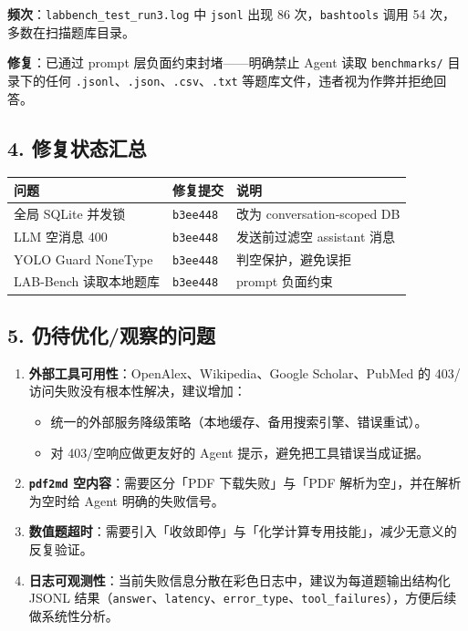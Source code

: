 \documentclass[
]{achemso}
\providecommand{\tightlist}{%
  \setlength{\itemsep}{0pt}\setlength{\parskip}{0pt}}
\begin{document}
\textbf{频次}：\texttt{labbench\_test\_run3.log} 中 \texttt{jsonl} 出现
86 次，\texttt{bashtools} 调用 54 次，多数在扫描题库目录。

\textbf{修复}：已通过 prompt 层负面约束封堵------明确禁止 Agent 读取
\texttt{benchmarks/} 目录下的任何
\texttt{.jsonl}、\texttt{.json}、\texttt{.csv}、\texttt{.txt}
等题库文件，违者视为作弊并拒绝回答。

\hypertarget{ux4feeux590dux72b6ux6001ux6c47ux603b}{%
\subsection{4.
修复状态汇总}\label{ux4feeux590dux72b6ux6001ux6c47ux603b}}

\begin{longtable}[]{@{}lll@{}}
\toprule
问题 & 修复提交 & 说明 \\
\midrule
\endhead
全局 SQLite 并发锁 & \texttt{b3ee448} & 改为 conversation-scoped DB \\
LLM 空消息 400 & \texttt{b3ee448} & 发送前过滤空 assistant 消息 \\
YOLO Guard NoneType & \texttt{b3ee448} & 判空保护，避免误拒 \\
LAB-Bench 读取本地题库 & \texttt{b3ee448} & prompt 负面约束 \\
\bottomrule
\end{longtable}

\hypertarget{ux4ecdux5f85ux4f18ux5316ux89c2ux5bdfux7684ux95eeux9898}{%
\subsection{5.
仍待优化/观察的问题}\label{ux4ecdux5f85ux4f18ux5316ux89c2ux5bdfux7684ux95eeux9898}}

\begin{enumerate}
\def\labelenumi{\arabic{enumi}.}
\tightlist
\item
  \textbf{外部工具可用性}：OpenAlex、Wikipedia、Google Scholar、PubMed
  的 403/访问失败没有根本性解决，建议增加：

  \begin{itemize}
  \tightlist
  \item
    统一的外部服务降级策略（本地缓存、备用搜索引擎、错误重试）。
  \item
    对 403/空响应做更友好的 Agent 提示，避免把工具错误当成证据。
  \end{itemize}
\item
  \textbf{\texttt{pdf2md} 空内容}：需要区分「PDF 下载失败」与「PDF
  解析为空」，并在解析为空时给 Agent 明确的失败信号。
\item
  \textbf{数值题超时}：需要引入「收敛即停」与「化学计算专用技能」，减少无意义的反复验证。
\item
  \textbf{日志可观测性}：当前失败信息分散在彩色日志中，建议为每道题输出结构化
  JSONL
  结果（\texttt{answer}、\texttt{latency}、\texttt{error\_type}、\texttt{tool\_failures}），方便后续做系统性分析。
\end{enumerate}
\end{document}
